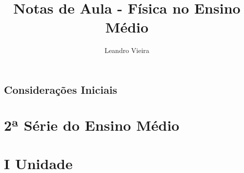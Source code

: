 \documentclass[12pt,a4paper]{book}
\author{Leandro Vieira}
\title{Notas de Aula - Física no Ensino Médio}
\begin{document}
\maketitle
\tableofcontents

\chapter{Considerações Iniciais}








\part{2ª Série do Ensino Médio}

\part*{I Unidade}
\end{document}
